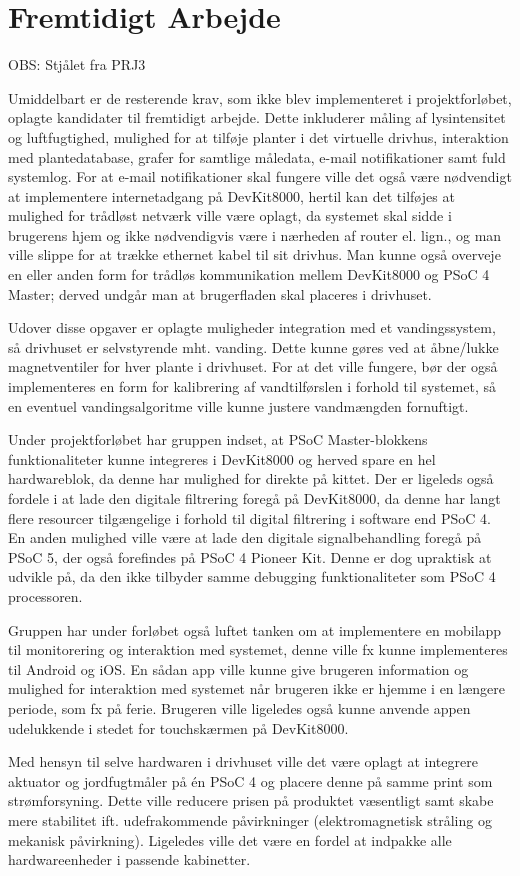 \section{Fremtidigt Arbejde} \label{ch:Fremtidigt_arbejde}

OBS: Stjålet fra PRJ3

Umiddelbart er de resterende krav, som ikke blev implementeret i projektforløbet, oplagte kandidater til fremtidigt arbejde.
Dette inkluderer måling af lysintensitet og luftfugtighed, mulighed for at tilføje planter i det virtuelle drivhus, interaktion med plantedatabase, grafer for samtlige måledata, e-mail notifikationer samt fuld systemlog.
For at e-mail notifikationer skal fungere ville det også være nødvendigt at implementere internetadgang på DevKit8000, hertil kan det tilføjes at mulighed for trådløst netværk ville være oplagt, da systemet skal sidde i brugerens hjem og ikke nødvendigvis være i nærheden af router el. lign., og man ville slippe for at trække ethernet kabel til sit drivhus.
Man kunne også overveje en eller anden form for trådløs kommunikation mellem DevKit8000 og PSoC 4 Master; derved undgår man at brugerfladen skal placeres i drivhuset. 

Udover disse opgaver er oplagte muligheder integration med et vandingssystem, så drivhuset er selvstyrende mht. vanding. 
Dette kunne gøres ved at åbne/lukke magnetventiler for hver plante i drivhuset. 
For at det ville fungere, bør der også implementeres en form for kalibrering af vandtilførslen i forhold til systemet, så en eventuel vandingsalgoritme ville kunne justere vandmængden fornuftigt.

Under projektforløbet har gruppen indset, at PSoC Master-blokkens funktionaliteter kunne integreres i DevKit8000 og herved spare en hel hardwareblok, da denne har mulighed for \IIC direkte på kittet.
Der er ligeleds også fordele i at lade den digitale filtrering foregå på DevKit8000, da denne har langt flere resourcer tilgængelige i forhold til digital filtrering i software end PSoC 4.
En anden mulighed ville være at lade den digitale signalbehandling foregå på PSoC 5, der også forefindes på PSoC 4 Pioneer Kit.
Denne er dog upraktisk at udvikle på, da den ikke tilbyder samme debugging funktionaliteter som PSoC 4 processoren.

Gruppen har under forløbet også luftet tanken om at implementere en mobilapp til monitorering og interaktion med systemet, denne ville fx kunne implementeres til Android og iOS.
En sådan app ville kunne give brugeren information og mulighed for interaktion med systemet når brugeren ikke er hjemme i en længere periode, som fx på ferie.
Brugeren ville ligeledes også kunne anvende appen udelukkende i stedet for touchskærmen på DevKit8000.

Med hensyn til selve hardwaren i drivhuset ville det være oplagt at integrere aktuator og jordfugtmåler på én PSoC 4 og placere denne på samme print som strømforsyning. 
Dette ville reducere prisen på produktet væsentligt samt skabe mere stabilitet ift. udefrakommende påvirkninger (elektromagnetisk stråling og mekanisk påvirkning).
Ligeledes ville det være en fordel at indpakke alle hardwareenheder i passende kabinetter.